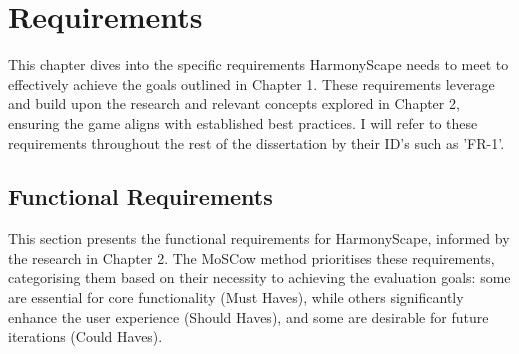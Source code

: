 \documentclass{l4proj}
\begin{document}



\chapter{Requirements}

This chapter dives into the specific requirements HarmonyScape needs to meet to effectively achieve the goals outlined in Chapter 1. These requirements leverage and build upon the research and relevant concepts explored in Chapter 2, ensuring the game aligns with established best practices. I will refer to these requirements throughout the rest of the dissertation by their ID's such as 'FR-1'.

\section{Functional Requirements}
This section presents the functional requirements for HarmonyScape, informed by the research in Chapter 2. The MoSCow method prioritises these requirements, categorising them based on their necessity to achieving the evaluation goals: some are essential for core functionality (Must Haves), while others significantly enhance the user experience (Should Haves), and some are desirable for future iterations (Could Haves).
\end{document}
